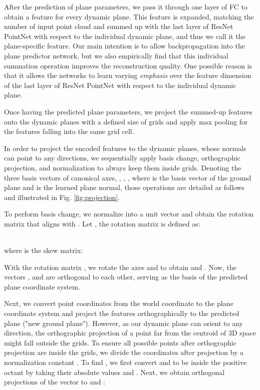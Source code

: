 \documentclass[10pt,twocolumn,letterpaper]{article}
\newcommand{\boldparagraph}[1]{\vspace{0.2cm}\noindent{\bf #1:} }
\begin{document}
After the prediction of plane parameters, we pass it through one layer of FC to obtain a feature for every dynamic plane.
This feature is expanded, matching the number of input point cloud and summed up with the last layer of ResNet PointNet with respect to the individual dynamic plane, and thus we call it the plane-specific feature.
Our main intention is to allow backpropagation into the plane predictor network, but we also empirically find that this individual summation operation improves the reconstruction quality. One possible reason is that it allows the networks to learn varying \emph{emphasis} over the feature dimension of the last layer of ResNet PointNet with respect to the individual dynamic plane. 

Once having the predicted plane parameters, we project the summed-up features onto the dynamic planes with a defined size of  grids and apply max pooling for the features falling into the same grid cell.

\boldparagraph{Planar projection} In order to project the encoded features to the dynamic planes, whose normals can point to any directions, we sequentially apply basis change, orthographic projection, and normalization to always keep them inside  grids. Denoting the three basis vectors of canonical axes, , , , where  is the basis vector of the ground plane and  is the learned plane normal, those operations are detailed as follows and illustrated in Fig. \ref{fig:projection}.

To perform basis change, we normalize  into a unit vector  and obtain the rotation matrix  that aligns  with . Let , the rotation matrix  is defined as:

\\
where  is the skew matrix:


With the rotation matrix , we rotate the axes  and  to obtain  and . Now, the vectors ,  and  are orthogonal to each other, serving as the basis of the predicted plane coordinate system.

Next, we convert point coordinates from the world coordinate to the plane coordinate system and project the features orthographically to the predicted plane ("new ground plane"). 
However, as our dynamic plane can orient to any direction, the orthographic projection of a point far from the centroid of 3D space might fall outside the  grids. To ensure all possible points after orthographic projection are inside the grids, we divide the coordinates after projection by a normalization constant . To find , we first convert  and  to be inside the positive octant by taking their absolute values  and . Next, we obtain orthogonal projections of the vector  to  and :
\end{document}
